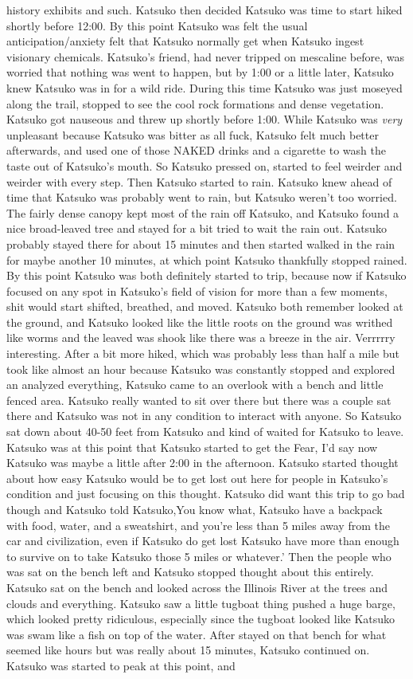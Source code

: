 \documentclass[12pt]{book}
\begin{document}
history exhibits and such. Katsuko then decided Katsuko was time to start hiked shortly before 12:00. By this point Katsuko was felt the usual anticipation/anxiety felt that Katsuko normally get when Katsuko ingest visionary chemicals. Katsuko's friend, had never tripped on mescaline before, was worried that nothing was went to happen, but by 1:00 or a little later, Katsuko knew Katsuko was in for a wild ride. During this time Katsuko was just moseyed along the trail, stopped to see the cool rock formations and dense vegetation. Katsuko got nauseous and threw up shortly before 1:00. While Katsuko was \emph{very} unpleasant because Katsuko was bitter as all fuck, Katsuko felt much better afterwards, and used one of those NAKED drinks and a cigarette to wash the taste out of Katsuko's mouth. So Katsuko pressed on, started to feel weirder and weirder with every step. Then Katsuko started to rain. Katsuko knew ahead of time that Katsuko was probably went to rain, but Katsuko weren't too worried. The fairly dense canopy kept most of the rain off Katsuko, and Katsuko found a nice broad-leaved tree and stayed for a bit tried to wait the rain out. Katsuko probably stayed there for about 15 minutes and then started walked in the rain for maybe another 10 minutes, at which point Katsuko thankfully stopped rained. By this point Katsuko was both definitely started to trip, because now if Katsuko focused on any spot in Katsuko's field of vision for more than a few moments, shit would start shifted, breathed, and moved. Katsuko both remember looked at the ground, and Katsuko looked like the little roots on the ground was writhed like worms and the leaved was shook like there was a breeze in the air. Verrrrry interesting. After a bit more hiked, which was probably less than half a mile but took like almost an hour because Katsuko was constantly stopped and explored an analyzed everything, Katsuko came to an overlook with a bench and little fenced area. Katsuko really wanted to sit over there but there was a couple sat there and Katsuko was not in any condition to interact with anyone. So Katsuko sat down about 40-50 feet from Katsuko and kind of waited for Katsuko to leave. Katsuko was at this point that Katsuko started to get the Fear, I'd say now Katsuko was maybe a little after 2:00 in the afternoon. Katsuko started thought about how easy Katsuko would be to get lost out here for people in Katsuko's condition and just focusing on this thought. Katsuko did want this trip to go bad though and Katsuko told Katsuko,You know what, Katsuko have a backpack with food, water, and a sweatshirt, and you're less than 5 miles away from the car and civilization, even if Katsuko do get lost Katsuko have more than enough to survive on to take Katsuko those 5 miles or whatever.' Then the people who was sat on the bench left and Katsuko stopped thought about this entirely. Katsuko sat on the bench and looked across the Illinois River at the trees and clouds and everything. Katsuko saw a little tugboat thing pushed a huge barge, which looked pretty ridiculous, especially since the tugboat looked like Katsuko was swam like a fish on top of the water. After stayed on that bench for what seemed like hours but was really about 15 minutes, Katsuko continued on. Katsuko was started to peak at this point, and 
\end{document}

